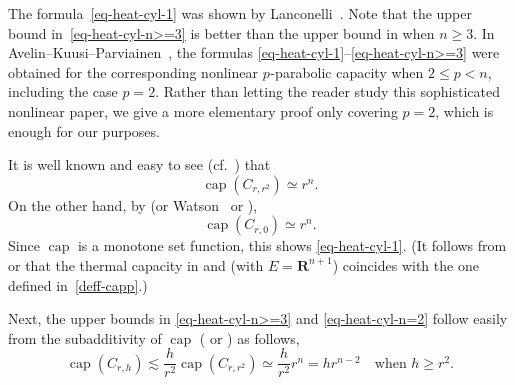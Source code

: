 \documentclass[a4paper, twoside]{article}
\makeatletter
\theoremstyle{propositional}
\theoremstyle{descriptive}
\renewenvironment{proof}[1][\proofname]{\par
  \pushQED{\qed}%
  \normalfont
  \trivlist
  \item[\hskip\labelsep
        \itshape
    #1\@addpunct{.}]\ignorespaces
}{%
  \popQED\endtrivlist\@endpefalse
}
\numberwithin{equation}{section}
\newcommand{\R}{\mathbf{R}}
\newcommand{\simle}{\lesssim}
\newcommand{\p}{{$p\mspace{1mu}$}}
\DeclareMathOperator{\capp}{cap}
\makeatother
\begin{document}
The formula~\eqref{eq-heat-cyl-1} was shown by
Lanconelli~\cite[Proposizione~5.1]{Lanc73}.
Note that the upper bound in~\eqref{eq-heat-cyl-n>=3}  is better
than the upper bound in \cite[Proposizione~6.1]{Lanc73} when $n\ge 3$.
In Avelin--Kuusi--Par\-vi\-ain\-en~\cite[Theorem~4.9 and
Corollary~2]{AvelinKP15}, 
the formulas \eqref{eq-heat-cyl-1}--\eqref{eq-heat-cyl-n>=3}
were obtained
for the corresponding nonlinear \p-parabolic capacity when $2 \le p <n$, including
the case $p=2$. 
Rather than letting the reader study this sophisticated nonlinear paper, we give a
more elementary proof only covering $p=2$, which is enough for our purposes.


\begin{proof}
It is well known and easy to see
(cf.\ \cite[Proposizione~4.1(ii)]{Lanc73})
that 
\[
\capp (C_{r,r^2}) \simeq r^n.
\]
On the other hand, 
by \cite[Proposizione~5.1]{Lanc73} (or Watson~\cite[Theorem~9]{watson78} or
\cite[Theorem~7.55]{watson}),
\[
\capp (C_{r,0}) \simeq r^n.
\]
Since $\capp$ is a monotone set function, this shows \eqref{eq-heat-cyl-1}.
(It follows from \cite[Lemma~4]{watson78} or
\cite[Lemmas~7.37 and~7.54]{watson} that the thermal 
capacity in \cite{watson78} and \cite{watson} (with $E=\R^{n+1}$)
coincides with the one defined in~\eqref{deff-capp}.)


Next, the upper bounds in \eqref{eq-heat-cyl-n>=3}
and \eqref{eq-heat-cyl-n=2} follow
easily from the subadditivity of $\capp$
(\cite[Proposizione~1.1(ii)]{Lanc73} or \cite[Theorem~7.44]{watson}) as follows,
\[
\capp (C_{r,h}) \simle \frac{h}{r^2} \capp (C_{r,r^2})
\simeq \frac{h}{r^2} r^n = h r^{n-2}
\quad \text{when } h \ge r^2.
\]


\end{proof}
\end{document}
